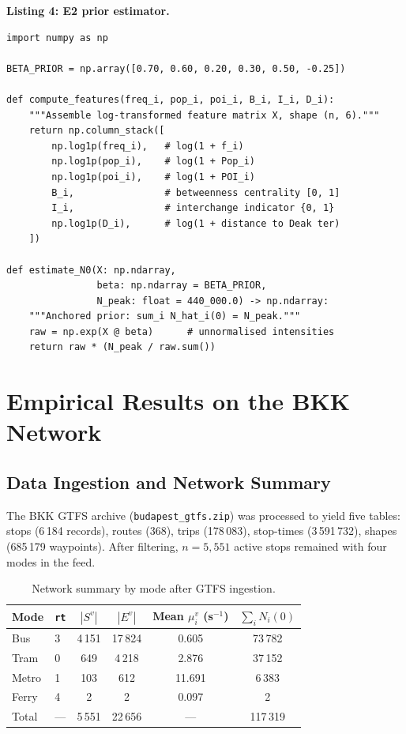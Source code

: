 \documentclass[11pt,a4paper]{article}
\theoremstyle{plain}
\theoremstyle{definition}
\theoremstyle{remark}
\begin{document}
\textbf{Listing 4: E2 prior estimator.}

\begin{lstlisting}[caption={E2 prior estimator for $\hat{N}_i(0)$
  (\texttt{bkk/demand.py}).},label={lst:prior}]
import numpy as np

BETA_PRIOR = np.array([0.70, 0.60, 0.20, 0.30, 0.50, -0.25])

def compute_features(freq_i, pop_i, poi_i, B_i, I_i, D_i):
    """Assemble log-transformed feature matrix X, shape (n, 6)."""
    return np.column_stack([
        np.log1p(freq_i),   # log(1 + f_i)
        np.log1p(pop_i),    # log(1 + Pop_i)
        np.log1p(poi_i),    # log(1 + POI_i)
        B_i,                # betweenness centrality [0, 1]
        I_i,                # interchange indicator {0, 1}
        np.log1p(D_i),      # log(1 + distance to Deak ter)
    ])

def estimate_N0(X: np.ndarray,
                beta: np.ndarray = BETA_PRIOR,
                N_peak: float = 440_000.0) -> np.ndarray:
    """Anchored prior: sum_i N_hat_i(0) = N_peak."""
    raw = np.exp(X @ beta)      # unnormalised intensities
    return raw * (N_peak / raw.sum())
\end{lstlisting}

\section{Empirical Results on the BKK Network}
\label{sec:results}

\subsection{Data Ingestion and Network Summary}

The BKK GTFS archive (\texttt{budapest\_gtfs.zip}) was processed to yield five
tables: stops (6\,184 records), routes (368), trips (178\,083), stop-times
(3\,591\,732), shapes (685\,179 waypoints).  After filtering, $n=5{,}551$
active stops remained with four modes in the feed.

\begin{table}[h]
\centering
\caption{Network summary by mode after GTFS ingestion.}
\label{tab:network}
\begin{tabular}{llcccc}
\toprule
Mode & \texttt{rt} & $|S^v|$ & $|E^v|$ & Mean $\mu^v_i$ (s$^{-1}$) & $\sum_i N_i(0)$ \\
\midrule
Bus   & 3 & 4\,151 & 17\,824 & 0.605 & 73\,782 \\
Tram  & 0 &   649  &  4\,218 & 2.876 & 37\,152 \\
Metro & 1 &   103  &    612  & 11.691 & 6\,383 \\
Ferry & 4 &     2  &      2  & 0.097 & 2 \\
\midrule
Total & --- & 5\,551 & 22\,656 & --- & 117\,319 \\
\bottomrule
\end{tabular}
\end{table}
\end{document}
